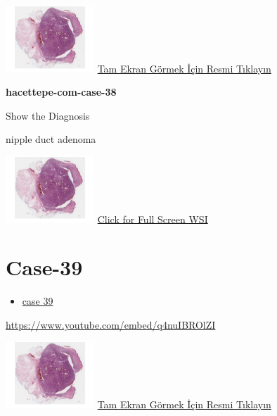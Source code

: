 \documentclass[
  letterpaper,
  paper=6in:9in,
  pagesize=pdftex,
  headinclude=on,
  footinclude=on,
  12pt]{scrbook}
\providecommand{\tightlist}{%
  \setlength{\itemsep}{0pt}\setlength{\parskip}{0pt}}\usepackage{longtable,booktabs,array}
\begin{document}
\href{https://images.patolojiatlasi.com/hacettepe-com-case-1/HE.html}{\includegraphics[width=0.25\textwidth,height=\textheight]{./screenshots/hacettepe-com-case-1_screenshot.png}}
\href{https://images.patolojiatlasi.com/hacettepe-com-case-38/HE.html}{Tam
Ekran Görmek İçin Resmi Tıklayın}

\textbf{hacettepe-com-case-38}

Show the Diagnosis

\hypertarget{answer38}{}
nipple duct adenoma

\href{https://images.patolojiatlasi.com/hacettepe-com-case-1/HE.html}{\includegraphics[width=0.25\textwidth,height=\textheight]{./screenshots/hacettepe-com-case-1_screenshot.png}}
\href{https://images.patolojiatlasi.com/hacettepe-com-case-38/HE.html}{Click
for Full Screen WSI}

\hypertarget{sec-hacettepe-case-of-the-month-case-39}{%
\section{Case-39}\label{sec-hacettepe-case-of-the-month-case-39}}

\begin{itemize}
\tightlist
\item
  \href{https://www.youtube.com/watch?v=q4nuIBROlZI\&ab_channel=KemalKosemehmetoglu}{case
  39}
\end{itemize}

\url{https://www.youtube.com/embed/q4nuIBROlZI}

\href{https://images.patolojiatlasi.com/hacettepe-com-case-1/HE.html}{\includegraphics[width=0.25\textwidth,height=\textheight]{./screenshots/hacettepe-com-case-1_screenshot.png}}
\href{https://images.patolojiatlasi.com/hacettepe-com-case-39/HE.html}{Tam
Ekran Görmek İçin Resmi Tıklayın}
\end{document}
